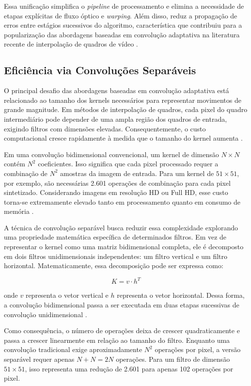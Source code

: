 \documentclass[
    12pt,                %
    openright,           %
    oneside,             %
    a4paper,             %
    english,             %
    brazil               %
]{abntex2}
\begin{document}
Essa unificação simplifica o \textit{pipeline} de processamento e elimina a necessidade de etapas explícitas de fluxo óptico e \textit{warping}. Além disso, reduz a propagação de erros entre estágios sucessivos do algoritmo, característica que contribuiu para a popularização das abordagens baseadas em convolução adaptativa na literatura recente de interpolação de quadros de vídeo \cite{Niklaus2017,Niklaus2021}.

\subsection{Eficiência via Convoluções Separáveis}

O principal desafio das abordagens baseadas em convolução adaptativa está relacionado ao tamanho dos kernels necessários para representar movimentos de grande magnitude. Em métodos de interpolação de quadros, cada pixel do quadro intermediário pode depender de uma ampla região dos quadros de entrada, exigindo filtros com dimensões elevadas. Consequentemente, o custo computacional cresce rapidamente à medida que o tamanho do kernel aumenta \cite{Niklaus2017}.

Em uma convolução bidimensional convencional, um kernel de dimensão $N \times N$ contém $N^2$ coeficientes. Isso significa que cada pixel processado requer a combinação de $N^2$ amostras da imagem de entrada. Para um kernel de $51 \times 51$, por exemplo, são necessárias 2.601 operações de combinação para cada pixel sintetizado. Considerando imagens em resolução HD ou Full HD, esse custo torna-se extremamente elevado tanto em processamento quanto em consumo de memória \cite{Niklaus2017,Niklaus2021}.

A técnica de convolução separável busca reduzir essa complexidade explorando uma propriedade matemática específica de determinados filtros. Em vez de representar o kernel como uma matriz bidimensional completa, ele é decomposto em dois filtros unidimensionais independentes: um filtro vertical e um filtro horizontal. Matematicamente, essa decomposição pode ser expressa como:

\[
K = v \cdot h^{T}
\]

onde $v$ representa o vetor vertical e $h$ representa o vetor horizontal. Dessa forma, a convolução bidimensional passa a ser executada em duas etapas sucessivas de convolução unidimensional \cite{Niklaus2017}.

Como consequência, o número de operações deixa de crescer quadraticamente e passa a crescer linearmente em relação ao tamanho do filtro. Enquanto uma convolução tradicional exige aproximadamente $N^2$ operações por pixel, a versão separável requer apenas $N + N = 2N$ operações. Para um filtro de dimensão $51 \times 51$, isso representa uma redução de 2.601 para apenas 102 operações por pixel.
\end{document}
